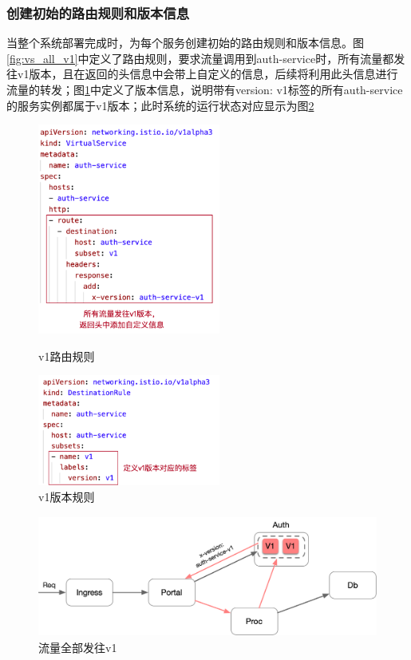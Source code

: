 \documentclass[12pt,a4paper]{article}
\theoremstyle{definition}
\begin{document}
\subsubsection{创建初始的路由规则和版本信息}\label{section:setup}当整个系统部署完成时，为每个服务创建初始的路由规则和版本信息。图\ref{fig:vs_all_v1}中定义了路由规则，要求流量调用到auth-service时，所有流量都发往v1版本，且在返回的头信息中会带上自定义的信息，后续将利用此头信息进行流量的转发；图\ref{fig:dr_v1}中定义了版本信息，说明带有{version: v1}标签的所有auth-service的服务实例都属于v1版本；此时系统的运行状态对应显示为图\ref{fig:traffic_all_v1}
\begin{figure}[htbp]
\centering
\begin{minipage}[t]{0.48\textwidth}
\centering
\centerline{\includegraphics[width=6cm]{vs_all_v1.png}}
\caption{v1路由规则}
\label{fig:vs_all_v1}
\end{minipage}
\begin{minipage}[t]{0.48\textwidth}
\centering
\centerline{\includegraphics[width=6cm]{dr_v1.png}}
\caption{v1版本规则}
\label{fig:dr_v1}
\end{minipage}
\end{figure}

\begin{figure}[ht]
 \centering
 \includegraphics[height=4cm]{images/traffic_all_v1.png}
 \caption{流量全部发往v1}
 \label{fig:traffic_all_v1}
\end{figure}
\end{document}
